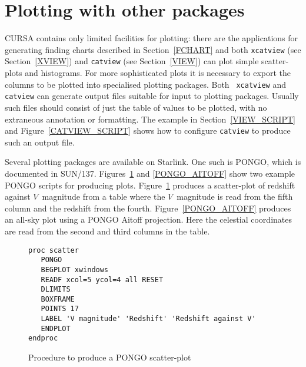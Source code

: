 \documentclass[twoside,11pt]{article}
\newcommand{\xref}[3]{#1}
\newcommand{\xlabel}[1]{}
\renewcommand{\_}{\texttt{\symbol{95}}}
\begin{document}
\section{\xlabel{PLOT}\label{PLOT}Plotting with other packages}

CURSA contains only limited facilities for plotting: there are the
applications for generating finding charts described in
Section~\ref{FCHART} and both {\tt xcatview} (see Section~\ref{XVIEW})
and {\tt catview} (see Section~\ref{VIEW}) can plot simple scatter-plots
and histograms.  For more sophisticated plots it is necessary to export
the columns to be plotted into specialised plotting packages.  Both {\tt
xcatview} and {\tt catview} can generate output files suitable for input to
plotting packages.  Usually such files should consist of just the table of
values to be plotted, with no extraneous annotation or formatting. The
example in Section~\ref{VIEW_SCRIPT} and Figure~\ref{CATVIEW_SCRIPT}
shows how to configure {\tt catview} to produce such an output file.

Several plotting packages are available on Starlink. One such is PONGO,
which is documented in \xref{SUN/137}{sun137}{}\cite{SUN137}.
Figures~\ref{PONGO_SCATTER} and \ref{PONGO_AITOFF} show two example PONGO
scripts for producing plots. Figure~\ref{PONGO_SCATTER} produces a 
scatter-plot of redshift against $V$\, magnitude from a table where the
$V$\, magnitude is read from the fifth column and the redshift from the
fourth.  Figure~\ref{PONGO_AITOFF} produces an all-sky plot using a PONGO
Aitoff projection. Here the celestial coordinates are read from the second
and third columns in the table.

\begin{figure}[htbp]

\begin{verbatim}
proc scatter
   PONGO
   BEGPLOT xwindows
   READF xcol=5 ycol=4 all RESET
   DLIMITS
   BOXFRAME
   POINTS 17
   LABEL 'V magnitude' 'Redshift' 'Redshift against V'
   ENDPLOT
endproc
\end{verbatim}

\caption{Procedure to produce a PONGO scatter-plot}
\label{PONGO_SCATTER}

\end{figure}
\end{document}
